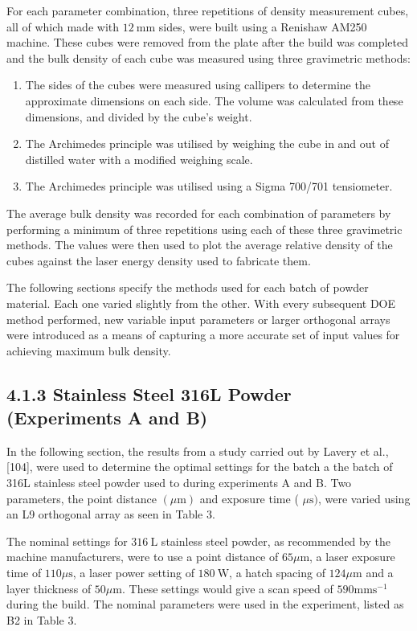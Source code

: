 \documentclass[10pt]{article}
\begin{document}
For each parameter combination, three repetitions of density measurement cubes, all of which made with $12 \mathrm{~mm}$ sides, were built using a Renishaw AM250 machine. These cubes were removed from the plate after the build was completed and the bulk density of each cube was measured using three gravimetric methods:

\begin{enumerate}
  \item The sides of the cubes were measured using callipers to determine the approximate dimensions on each side. The volume was calculated from these dimensions, and divided by the cube's weight.

  \item The Archimedes principle was utilised by weighing the cube in and out of distilled water with a modified weighing scale.

  \item The Archimedes principle was utilised using a Sigma 700/701 tensiometer.

\end{enumerate}

The average bulk density was recorded for each combination of parameters by performing a minimum of three repetitions using each of these three gravimetric methods. The values were then used to plot the average relative density of the cubes against the laser energy density used to fabricate them.

The following sections specify the methods used for each batch of powder material. Each one varied slightly from the other. With every subsequent DOE method performed, new variable input parameters or larger orthogonal arrays were introduced as a means of capturing a more accurate set of input values for achieving maximum bulk density.

\subsection*{4.1.3 Stainless Steel 316L Powder (Experiments A and B)}
In the following section, the results from a study carried out by Lavery et al., [104], were used to determine the optimal settings for the batch a the batch of 316L stainless steel powder used to during experiments A and B. Two parameters, the point distance $(\mu \mathrm{m})$ and exposure time ( $\mu \mathrm{s})$, were varied using an L9 orthogonal array as seen in Table 3.

The nominal settings for $316 \mathrm{~L}$ stainless steel powder, as recommended by the machine manufacturers, were to use a point distance of $65 \mu \mathrm{m}$, a laser exposure time of $110 \mu \mathrm{s}$, a laser power setting of $180 \mathrm{~W}$, a hatch spacing of $124 \mu \mathrm{m}$ and a layer thickness of $50 \mu \mathrm{m}$. These settings would give a scan speed of $590 \mathrm{mms}^{-1}$ during the build. The nominal parameters were used in the experiment, listed as B2 in Table 3.
\end{document}
